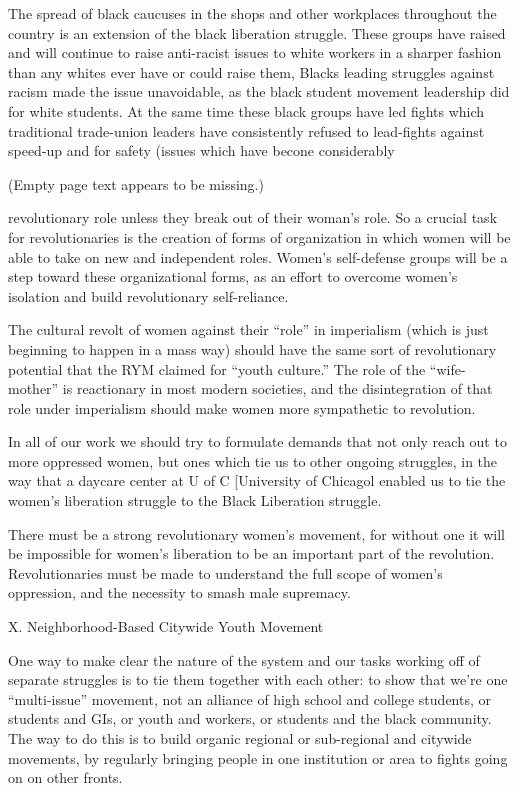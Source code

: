 \documentclass[12pt, titlepage]{article}
\begin{document}
{\begin{spacing}{1.10}
The spread of black caucuses in the shops and other workplaces throughout the country is an extension of the black liberation struggle. These groups have raised and will continue to raise anti-racist issues to white workers in a sharper fashion than any whites ever have or could raise them, Blacks leading struggles against racism made the issue unavoidable, as the black student movement leadership did for white students. At the same time these black groups have led fights which traditional trade-union leaders have consistently refused to lead-fights against speed-up and for safety (issues which have becone considerably 

(Empty page text appears to be missing.)

revolutionary role unless they break out of their woman's role. So a crucial task for revolutionaries is the creation of forms of organization in which women will be able to take on new and independent roles. Women's self-defense groups will be a step toward these organizational forms, as an effort to overcome women's isolation and build revolutionary self-reliance.

The cultural revolt of women against their ``role'' in imperialism (which is just beginning to happen in a mass way) should have the same sort of revolutionary potential that the RYM claimed for ``youth culture.'' The role of the ``wife-mother'' is reactionary in most modern societies, and the disintegration of that role under imperialism should make women more sympathetic to revolution.

In all of our work we should try to formulate demands that not only reach out to more oppressed women, but ones which tie us to other ongoing struggles, in the way that a daycare center at U of C [University of Chicagol enabled us to tie the women's liberation struggle to the Black Liberation struggle.

There must be a strong revolutionary women's movement, for without one it will be impossible for women's liberation to be an important part of the revolution. Revolutionaries must be made to understand the full scope of women's oppression, and the necessity to smash male supremacy.

\begin{center}
X. Neighborhood-Based Citywide Youth Movement
\end{center}

One way to make clear the nature of the system and our tasks working off of separate struggles is to tie them together with each other: to show that we're one ``multi-issue'' movement, not an alliance of high school and college students, or students and GIs, or youth and workers, or students and the black community. The way to do this is to build organic regional or sub-regional and citywide movements, by regularly bringing people in one institution or area to fights going on on other fronts.


\end{spacing}}
\end{document}
